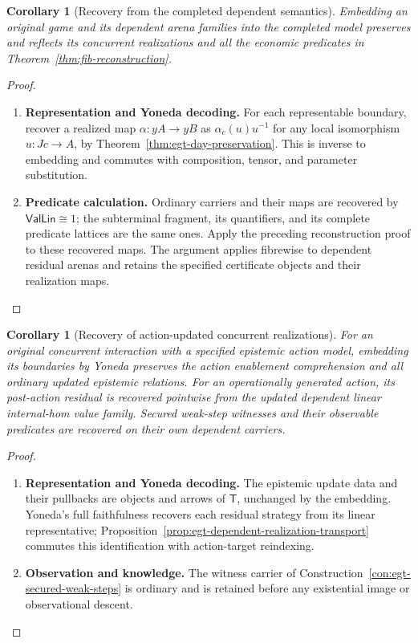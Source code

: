 \documentclass[11pt,a4paper]{article}
\numberwithin{equation}{section}
\newtheorem{corollary}[theorem]{Corollary}
\theoremstyle{definition}
\theoremstyle{remark}
\theoremstyle{plain}
\begin{document}
\begin{corollary}[Recovery from the completed dependent semantics]
\label{cor:egt-completed-reconstruction}
Embedding an original game and its dependent arena families into the
completed model preserves and reflects its concurrent realizations and
all the economic predicates in Theorem~\ref{thm:fib-reconstruction}.
\end{corollary}
\begin{proof}
\leavevmode
\begin{enumerate}[label=\textup{(\arabic*)},leftmargin=*,itemsep=4pt,topsep=3pt]
  \item \textbf{Representation and Yoneda decoding.} For each representable boundary, recover a realized map $\alpha:yA\to yB$
as $\alpha_c(u)u^{-1}$ for any local isomorphism $u:Jc\to A$, by Theorem~\ref{thm:egt-day-preservation}. This is inverse to embedding and commutes with composition, tensor,
and parameter substitution.
  \item \textbf{Predicate calculation.} Ordinary carriers and their maps are
recovered by $\mathsf{Val}\mathsf{Lin}\cong1$; the subterminal fragment,
its quantifiers, and its complete predicate lattices are the same ones. Apply the preceding reconstruction proof to these recovered maps. The argument applies fibrewise to dependent residual arenas and retains
the specified certificate objects and their realization maps.
\end{enumerate}
\end{proof}

\begin{corollary}[Recovery of action-updated concurrent realizations]
\label{cor:egt-action-completed-reconstruction}
For an original concurrent interaction with a specified epistemic
action model, embedding its boundaries by Yoneda preserves the action
enablement comprehension and all ordinary updated epistemic relations.
For an operationally generated action, its post-action residual is
recovered pointwise from the updated dependent linear internal-hom
value family. Secured weak-step witnesses and their observable
predicates are recovered on their own dependent carriers.
\end{corollary}
\begin{proof}
\leavevmode
\begin{enumerate}[label=\textup{(\arabic*)},leftmargin=*,itemsep=4pt,topsep=3pt]
  \item \textbf{Representation and Yoneda decoding.} The epistemic update data and their pullbacks are objects and arrows
of $\mathsf T$, unchanged by the embedding. Yoneda's full faithfulness
recovers each residual strategy from its linear representative;
Proposition~\ref{prop:egt-dependent-realization-transport} commutes
this identification with action-target reindexing.
  \item \textbf{Observation and knowledge.} The witness carrier
of Construction~\ref{con:egt-secured-weak-steps} is ordinary and is
retained before any existential image or observational descent.
\end{enumerate}
\end{proof}
\end{document}

